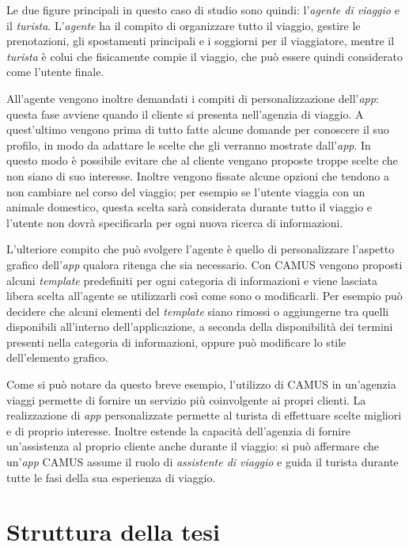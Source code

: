 Le due figure principali in questo caso di studio sono quindi: l'\emph{agente di viaggio} e il \emph{turista}. L'\emph{agente} ha il compito di organizzare tutto il viaggio, gestire le prenotazioni, gli spostamenti principali e i soggiorni per il viaggiatore, mentre il \emph{turista} è colui che fisicamente compie il viaggio, che può essere quindi considerato come l'utente finale.

All'agente vengono inoltre demandati i compiti di personalizzazione dell'\emph{app}: questa fase avviene quando il cliente si presenta nell'agenzia di viaggio. A quest'ultimo vengono prima di tutto fatte alcune domande per conoscere il suo profilo, in modo da adattare le scelte che gli verranno mostrate dall'\emph{app}. In questo modo è possibile evitare che al cliente vengano proposte troppe scelte che non siano di suo interesse. Inoltre vengono fissate alcune opzioni che tendono a non cambiare nel corso del viaggio; per esempio se l'utente viaggia con un animale domestico, questa scelta sarà considerata durante tutto il viaggio e l'utente non dovrà specificarla per ogni nuova ricerca di informazioni. %

L'ulteriore compito che può svolgere l'agente è quello di personalizzare l'aspetto grafico dell'\emph{app} qualora ritenga che sia necessario. Con CAMUS vengono proposti alcuni \emph{template} predefiniti per ogni categoria di informazioni e viene lasciata libera scelta all'agente se utilizzarli così come sono o modificarli. Per esempio può decidere che alcuni elementi del \emph{template} siano rimossi o aggiungerne tra quelli disponibili all'interno dell'applicazione, a seconda della disponibilità dei termini presenti nella categoria di informazioni, oppure può modificare lo stile dell'elemento grafico.

Come si può notare da questo breve esempio, l'utilizzo di CAMUS in un'agenzia viaggi permette di fornire un servizio più coinvolgente ai propri clienti. La realizzazione di \emph{app} personalizzate permette al turista di effettuare scelte migliori e di proprio interesse. Inoltre estende la capacità dell'agenzia di fornire un'assistenza al proprio cliente anche durante il viaggio: si può affermare che un'\emph{app} CAMUS assume il ruolo di \emph{assistente di viaggio} e guida il turista durante tutte le fasi della sua esperienza di viaggio.

\section{Struttura della tesi}


